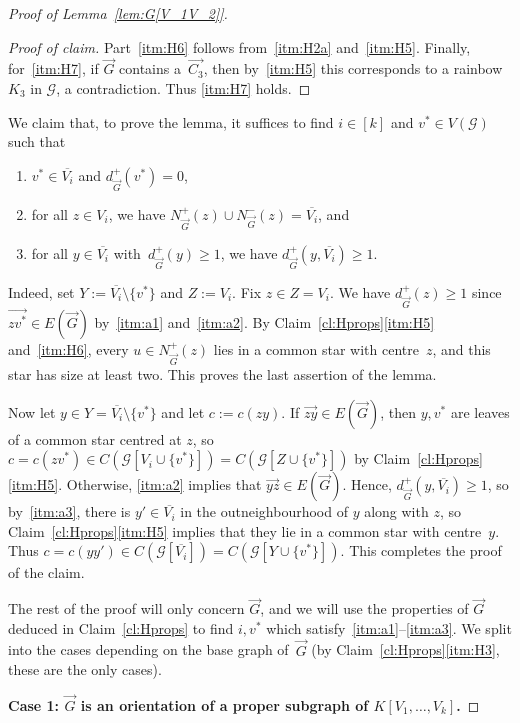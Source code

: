 \documentclass[a4paper, 12pt]{article}
\numberwithin{equation}{section}
\newenvironment{proofclaim}[1][Proof of claim]{\begin{proof}[#1]\renewcommand*{\qedsymbol}{\(\blacksquare\)}}{\end{proof}}
\def\sm{{\setminus}}
\newcommand{\ova}[1]{\overrightarrow{#1}}
\newcommand{\ms}[1]{\mathscr{#1}}
\begin{document}
\begin{proof}[Proof of Lemma~\ref{lem:G[V_1V_2]}]
\begin{proofclaim}
Part~\ref{itm:H6} follows from~\ref{itm:H2a} and~\ref{itm:H5}. 
Finally, for~\ref{itm:H7},
if $\ova{G}$ contains a~$\ova{C_3}$, then by~\ref{itm:H5} this corresponds to a rainbow~$K_3$ in $\ms{G}$, a contradiction. 
Thus \ref{itm:H7} holds. 
\end{proofclaim}

We claim that, to prove the lemma, it suffices to find $i \in [k]$ and $v^* \in V(\ms{G})$ such that
\begin{enumerate}[label = {\rm(\alph*)}]
\item\label{itm:a1} $v^* \in \overline{V_i}$ and $d^+_{\ova{G}}(v^*) = 0$, 
\item\label{itm:a2} for all $z \in V_i$, we have $N^+_{\ova{G}}(z) \cup N^-_{\ova{G}}(z) = \overline{V_i}$, and
\item\label{itm:a3} for all $y \in \overline{V_i}$ with~$d^+_{\ova{G}}(y) \ge 1$, we have $d^+_{\ova{G}}(y,  \overline{V_i} ) \ge 1$. 
\end{enumerate}
Indeed, set $Y := \overline{V_i}\sm\{v^*\}$ and $Z := V_i$.
Fix $z \in Z = V_i$.
We have $d^+_{\ova{G}}(z) \geq 1$ since $\ova{zv^*} \in E(\ova{G})$ by~\ref{itm:a1} and~\ref{itm:a2}.
By Claim~\ref{cl:Hprops}\ref{itm:H5} and~\ref{itm:H6}, every $u \in N^+_{\ova{G}}(z)$ lies in a common star with centre~$z$, and this star has size at least two.
This proves the last assertion of the lemma. 

Now let $y \in Y = \overline{V_i}\sm\{v^*\}$ and let $c := c(zy)$.
If $\ova{zy} \in E(\ova{G})$, then $y,v^*$ are leaves of a common star centred at $z$, so $c = c(zv^*) \in C(\ms{G}[V_i \cup \{v^*\}]) =  C(\ms{G}[Z \cup \{v^*\}])$ by Claim~\ref{cl:Hprops}\ref{itm:H5}.
Otherwise, \ref{itm:a2} implies that $\ova{yz} \in E(\ova{G})$.
Hence,  $d^+_{\ova{G}}(y,\overline{V_i}) \geq 1$, so by~\ref{itm:a3}, there is
$y' \in \overline{V_i}$ in the outneighbourhood of $y$ along with $z$, so Claim~\ref{cl:Hprops}\ref{itm:H5} implies that they lie in a common star with centre~$y$.
Thus $c=c(yy') \in C(\ms{G}[\overline{V_i}]) = C(\ms{G}[Y \cup \{v^*\}])$.
This completes the proof of the claim.

The rest of the proof will only concern $\ova{G}$, and we will use the properties of $\ova{G}$ deduced in Claim~\ref{cl:Hprops} to find $i,v^*$ which satisfy~\ref{itm:a1}--\ref{itm:a3}.
We split into the cases depending on the base graph of~$\ova{G}$ (by Claim~\ref{cl:Hprops}\ref{itm:H3}, these are the only cases).

\medskip
\noindent
\textbf{Case 1: $\ova{G}$ is an orientation of a proper subgraph of $K[V_1,\ldots,V_k]$.}


\end{proof}
\end{document}
